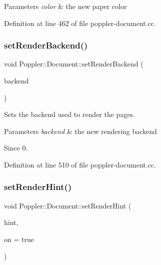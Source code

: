 \begin{DoxyParams}{Parameters}
{\em color} & the new paper color \\
\hline
\end{DoxyParams}


Definition at line 462 of file poppler-\/document.\+cc.

\mbox{\label{class_poppler_1_1_document_a81a758f83530fa1cfaddf748c6be89c9}} 
\subsubsection{\texorpdfstring{set\+Render\+Backend()}{setRenderBackend()}}
{\footnotesize\ttfamily void Poppler\+::\+Document\+::set\+Render\+Backend (\begin{DoxyParamCaption}\item[{\hyperlink{class_poppler_1_1_document_a4b0a8ab6b6f686c8802a0ad112d48247}{Document\+::\+Render\+Backend}}]{backend }\end{DoxyParamCaption})}

Sets the backend used to render the pages.


\begin{DoxyParams}{Parameters}
{\em backend} & the new rendering backend\\
\hline
\end{DoxyParams}
\begin{DoxySince}{Since}
0. 
\end{DoxySince}


Definition at line 510 of file poppler-\/document.\+cc.

\mbox{\label{class_poppler_1_1_document_a3f7655bb9e6893515bbc64b90b487ffc}} 
\subsubsection{\texorpdfstring{set\+Render\+Hint()}{setRenderHint()}}
{\footnotesize\ttfamily void Poppler\+::\+Document\+::set\+Render\+Hint (\begin{DoxyParamCaption}\item[{\hyperlink{class_poppler_1_1_document_a8420ce678235ee6214fbd91f5ae2f4e9}{Document\+::\+Render\+Hint}}]{hint,  }\item[{bool}]{on = {\ttfamily true} }\end{DoxyParamCaption})}


